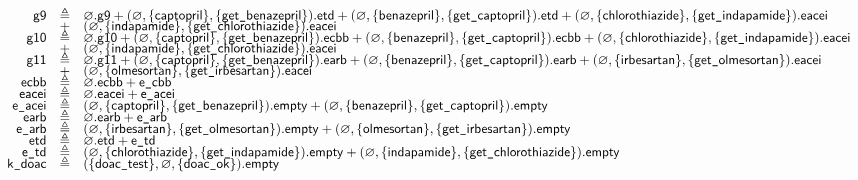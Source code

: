 \begin{figure}[t]
\[\begin{array}{rcl}
\mathsf{g9} &  \triangleq 
& \varnothing.\mathsf{g9} 
+ (\varnothing,\{\mathsf{captopril}\},\{\mathsf{get}\texttt{\_}\mathsf{benazepril}\}).\mathsf{etd}
+ (\varnothing,\{\mathsf{benazepril}\},\{\mathsf{get}\texttt{\_}\mathsf{captopril}\}).\mathsf{etd}
+ (\varnothing,\{\mathsf{chlorothiazide}\},\{\mathsf{get}\texttt{\_}\mathsf{indapamide}\}).\mathsf{eacei}
\\[-4pt]
& + & (\varnothing,\{\mathsf{indapamide}\},\{\mathsf{get}\texttt{\_}\mathsf{chlorothiazide}\}).\mathsf{eacei}
\\[-4pt]
\mathsf{g10} &  \triangleq 
& \varnothing.\mathsf{g10} 
+ (\varnothing,\{\mathsf{captopril}\},\{\mathsf{get}\texttt{\_}\mathsf{benazepril}\}).\mathsf{ecbb}
+ (\varnothing,\{\mathsf{benazepril}\},\{\mathsf{get}\texttt{\_}\mathsf{captopril}\}).\mathsf{ecbb}
+ (\varnothing,\{\mathsf{chlorothiazide}\},\{\mathsf{get}\texttt{\_}\mathsf{indapamide}\}).\mathsf{eacei}
\\[-4pt]
& + & (\varnothing,\{\mathsf{indapamide}\},\{\mathsf{get}\texttt{\_}\mathsf{chlorothiazide}\}).\mathsf{eacei}
\\[-4pt]
\mathsf{g11} &  \triangleq 
& \varnothing.\mathsf{g11} 
+ (\varnothing,\{\mathsf{captopril}\},\{\mathsf{get}\texttt{\_}\mathsf{benazepril}\}).\mathsf{earb}
+ (\varnothing,\{\mathsf{benazepril}\},\{\mathsf{get}\texttt{\_}\mathsf{captopril}\}).\mathsf{earb}
+ (\varnothing,\{\mathsf{irbesartan}\},\{\mathsf{get}\texttt{\_}\mathsf{olmesortan}\}).\mathsf{eacei}
\\[-4pt]
& + & (\varnothing,\{\mathsf{olmesortan}\},\{\mathsf{get}\texttt{\_}\mathsf{irbesartan}\}).\mathsf{eacei}
\\[-4pt]
\mathsf{ecbb} &  \triangleq 
& \varnothing.\mathsf{ecbb} + \mathsf{e}\texttt{\_}\mathsf{cbb}
\\[-4pt]
\mathsf{eacei} &  \triangleq 
& \varnothing.\mathsf{eacei} + \mathsf{e}\texttt{\_}\mathsf{acei}
\\[-4pt]
\mathsf{e}\texttt{\_}\mathsf{acei} &  \triangleq 
& (\varnothing,\{\mathsf{captopril}\},\{\mathsf{get}\texttt{\_}\mathsf{benazepril}\}).\mathsf{empty} 
+ (\varnothing,\{\mathsf{benazepril}\},\{\mathsf{get}\texttt{\_}\mathsf{captopril}\}).\mathsf{empty}
\\[-4pt]
\mathsf{earb} &  \triangleq 
& \varnothing.\mathsf{earb} + \mathsf{e}\texttt{\_}\mathsf{arb}
\\[-4pt]
\mathsf{e}\texttt{\_}\mathsf{arb} &  \triangleq 
& (\varnothing,\{\mathsf{irbesartan}\},\{\mathsf{get}\texttt{\_}\mathsf{olmesortan}\}).\mathsf{empty} 
+ (\varnothing,\{\mathsf{olmesortan}\},\{\mathsf{get}\texttt{\_}\mathsf{irbesartan}\}).\mathsf{empty}
\\[-4pt]
\mathsf{etd} &  \triangleq 
& \varnothing.\mathsf{etd} + \mathsf{e}\texttt{\_}\mathsf{td}
\\[-4pt]
\mathsf{e}\texttt{\_}\mathsf{td} &  \triangleq 
& (\varnothing,\{\mathsf{chlorothiazide}\},\{\mathsf{get}\texttt{\_}\mathsf{indapamide}\}).\mathsf{empty} 
+ (\varnothing,\{\mathsf{indapamide}\},\{\mathsf{get}\texttt{\_}\mathsf{chlorothiazide}\}).\mathsf{empty}
\\[-4pt]
\mathsf{k}\texttt{\_}\mathsf{doac} &  \triangleq 
& (\{\mathsf{doac}\texttt{\_}\mathsf{test}\},\varnothing,\{\mathsf{doac}\texttt{\_}\mathsf{ok}\}).\mathsf{empty} 

\end{array}\]
\end{figure}
